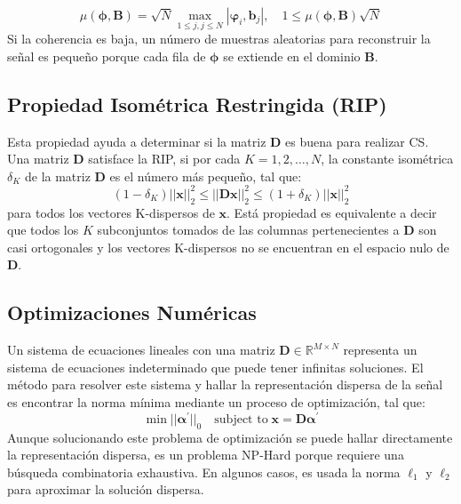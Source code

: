 \begin{equation}
\mu(\boldsymbol{\phi},\boldsymbol{B})= \sqrt{N} \max_{1 \leq j, j \leq N} | \boldsymbol{\varphi}_i,\boldsymbol{b}_j|, \quad 1\leq \mu(\boldsymbol{\phi},\boldsymbol{B}) \sqrt{N}
\end{equation}
Si la coherencia es baja, un n\'umero de muestras aleatorias para reconstruir la se\~nal es peque\~no porque cada fila de $\boldsymbol{\phi}$ se extiende en el dominio $\boldsymbol{B}$.

\subsection{Propiedad Isom\'etrica Restringida (RIP)}

Esta propiedad ayuda a determinar si la matriz $\boldsymbol{D}$ es  buena para realizar CS. Una matriz $\boldsymbol{D}$ satisface la RIP, si por cada $K = 1,2, \ldots, N$, la constante isom\'etrica $\delta_K$ de la matriz $\boldsymbol{D}$ es el n\'umero m\'as peque\~no, tal que: 
\begin{equation}
(1-\delta_K)||\boldsymbol{x}||_2^2 \leq ||\boldsymbol{Dx}||^2_2 \leq (1+\delta_K)||\boldsymbol{x}||^2_2
\end{equation}
para todos los vectores K-dispersos de $\boldsymbol{x}$. Est\'a propiedad es equivalente a decir que todos los $K$ subconjuntos tomados de las columnas pertenecientes a $\boldsymbol{D}$ son casi ortogonales y los vectores K-dispersos no se encuentran en el espacio nulo de $\boldsymbol{D}$.

\subsection{Optimizaciones Num\'ericas}

Un sistema de ecuaciones lineales con una matriz $\boldsymbol{D} \in \mathbb{R}^{M \times N}$ representa un sistema de ecuaciones indeterminado que puede tener infinitas soluciones. El m\'etodo para resolver este sistema y hallar la representaci\'on dispersa de la se\~nal es encontrar la norma m\'inima mediante un proceso de optimizaci\'on, tal que: 
\begin{equation}
\min||\boldsymbol{\alpha^\prime}||_0 \quad \textrm{subject to} \; \boldsymbol{x} = \boldsymbol{D \alpha^\prime}
\end{equation}
Aunque solucionando este problema de optimizaci\'on se puede hallar directamente la representaci\'on dispersa, es un problema NP-Hard porque requiere una b\'usqueda combinatoria exhaustiva. En algunos casos, es usada la norma $\ell_1$ y $\ell_2$ para aproximar la soluci\'on dispersa. \\


